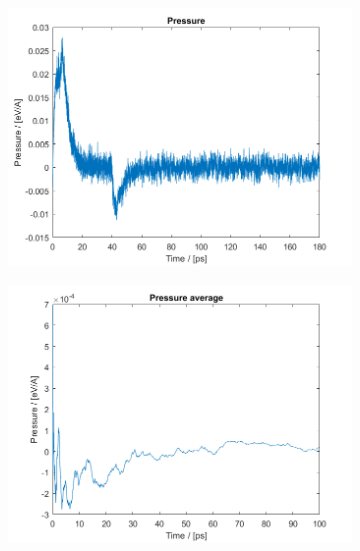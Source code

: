 \begin{figure}[H]
    \centering
    \captionsetup[subfigure]{justification=centering}
    \begin{subfigure}[b]{0.40\textwidth}
        \centering
        \includegraphics[width=\textwidth]{graphics/task4/pressure.png}
    \end{subfigure}
    \begin{subfigure}[b]{0.40\textwidth}
        \centering
        \includegraphics[width=\textwidth]{graphics/task4/pressure_avg.png}
    \end{subfigure}
    \begin{subfigure}[b]{0.40\textwidth}
        \centering

\end{subfigure}
\end{figure}
